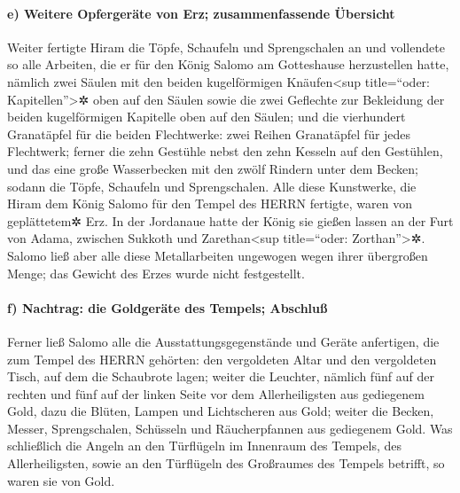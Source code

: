 \hypertarget{e-weitere-opfergeruxe4te-von-erz-zusammenfassende-uxfcbersicht}{%
\paragraph{e) Weitere Opfergeräte von Erz; zusammenfassende
Übersicht}\label{e-weitere-opfergeruxe4te-von-erz-zusammenfassende-uxfcbersicht}}

Weiter fertigte Hiram die Töpfe, Schaufeln und
Sprengschalen an und vollendete so alle Arbeiten, die er für den König
Salomo am Gotteshause herzustellen hatte, nämlich zwei
Säulen mit den beiden kugelförmigen Knäufen\textless sup title=``oder:
Kapitellen''\textgreater✲ oben auf den Säulen sowie die zwei Geflechte
zur Bekleidung der beiden kugelförmigen Kapitelle oben auf den Säulen;
und die vierhundert Granatäpfel für die beiden
Flechtwerke: zwei Reihen Granatäpfel für jedes Flechtwerk;
ferner die zehn Gestühle nebst den zehn Kesseln auf den
Gestühlen, und das eine große Wasserbecken mit den zwölf
Rindern unter dem Becken; sodann die Töpfe, Schaufeln und
Sprengschalen. Alle diese Kunstwerke, die Hiram dem König Salomo für den
Tempel des HERRN fertigte, waren von geplättetem✲ Erz. In
der Jordanaue hatte der König sie gießen lassen an der Furt von Adama,
zwischen Sukkoth und Zarethan\textless sup title=``oder:
Zorthan''\textgreater✲. Salomo ließ aber alle diese
Metallarbeiten ungewogen wegen ihrer übergroßen Menge; das Gewicht des
Erzes wurde nicht festgestellt.

\hypertarget{f-nachtrag-die-goldgeruxe4te-des-tempels-abschluuxdf}{%
\paragraph{f) Nachtrag: die Goldgeräte des Tempels;
Abschluß}\label{f-nachtrag-die-goldgeruxe4te-des-tempels-abschluuxdf}}

Ferner ließ Salomo alle die Ausstattungsgegenstände und
Geräte anfertigen, die zum Tempel des HERRN gehörten: den vergoldeten
Altar und den vergoldeten Tisch, auf dem die Schaubrote lagen;
weiter die Leuchter, nämlich fünf auf der rechten und
fünf auf der linken Seite vor dem Allerheiligsten aus gediegenem Gold,
dazu die Blüten, Lampen und Lichtscheren aus Gold; weiter
die Becken, Messer, Sprengschalen, Schüsseln und Räucherpfannen aus
gediegenem Gold. Was schließlich die Angeln an den Türflügeln im
Innenraum des Tempels, des Allerheiligsten, sowie an den Türflügeln des
Großraumes des Tempels betrifft, so waren sie von Gold.

